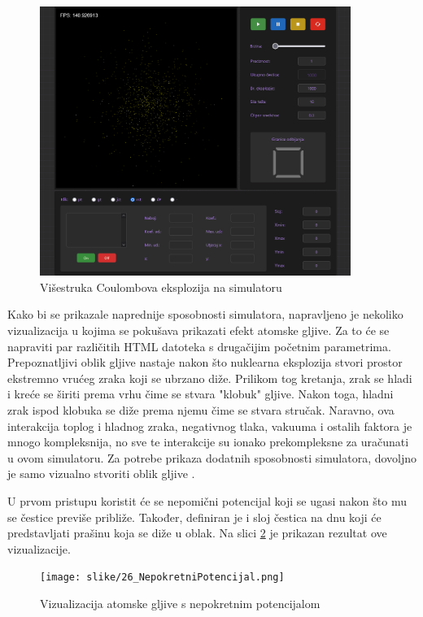 \documentclass{foi}
\begin{document}
\begin{figure}[H]
    \centering
    \includegraphics[width=0.9\textwidth]{slike/25_VCESimulator.png}
    \captionsetup{justification=centering}
    \caption{Višestruka Coulombova eksplozija na simulatoru}
\label{fig:VCESimulator}
\end{figure}

Kako bi se prikazale naprednije sposobnosti simulatora, napravljeno je nekoliko vizualizacija u kojima se pokušava prikazati efekt atomske gljive. Za to će se napraviti par različitih HTML datoteka s drugačijim početnim parametrima. Prepoznatljivi oblik gljive nastaje nakon što nuklearna eksplozija stvori prostor ekstremno vrućeg zraka koji se ubrzano diže. Prilikom tog kretanja, zrak se hladi i kreće se širiti prema vrhu čime se stvara "klobuk" gljive. Nakon toga, hladni zrak ispod klobuka se diže prema njemu čime se stvara stručak. Naravno, ova interakcija toplog i hladnog zraka, negativnog tlaka, vakuuma i ostalih faktora je mnogo kompleksnija, no sve te interakcije su ionako prekompleksne za uračunati u ovom simulatoru. Za potrebe prikaza dodatnih sposobnosti simulatora, dovoljno je samo vizualno stvoriti oblik gljive \parencite{MushroomCloudBezDat}.

U prvom pristupu koristit će se nepomični potencijal koji se ugasi nakon što mu se čestice previše približe. Također, definiran je i sloj čestica na dnu koji će predstavljati prašinu koja se diže u oblak. Na slici \ref{fig:NepokretniPotencijal} je prikazan rezultat ove vizualizacije.

\begin{figure}[H]
    \centering
    \texttt{[image: slike/26\_NepokretniPotencijal.png]}
    \captionsetup{justification=centering}
    \caption{Vizualizacija atomske gljive s nepokretnim potencijalom}
\label{fig:NepokretniPotencijal}
\end{figure}
\end{document}
